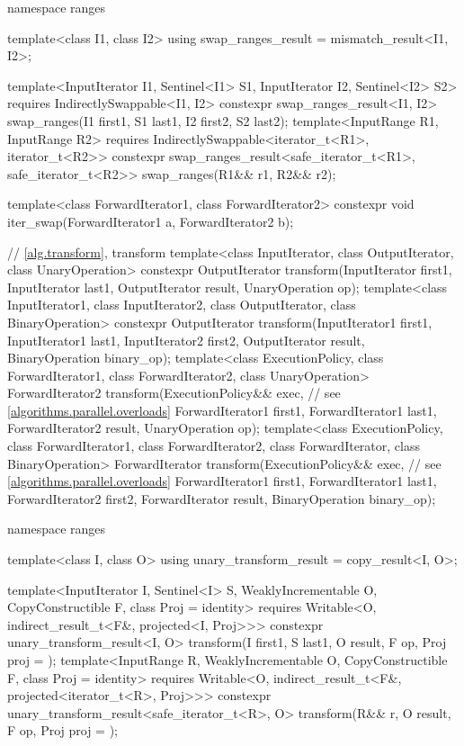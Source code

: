 \begin{codeblock}
{  namespace ranges {
    template<class I1, class I2>
    using swap_ranges_result = mismatch_result<I1, I2>;

    template<InputIterator I1, Sentinel<I1> S1, InputIterator I2, Sentinel<I2> S2>
      requires IndirectlySwappable<I1, I2>
      constexpr swap_ranges_result<I1, I2>
        swap_ranges(I1 first1, S1 last1, I2 first2, S2 last2);
    template<InputRange R1, InputRange R2>
      requires IndirectlySwappable<iterator_t<R1>, iterator_t<R2>>
      constexpr swap_ranges_result<safe_iterator_t<R1>, safe_iterator_t<R2>>
        swap_ranges(R1&& r1, R2&& r2);
  }

  template<class ForwardIterator1, class ForwardIterator2>
    constexpr void iter_swap(ForwardIterator1 a, ForwardIterator2 b);

  // \ref{alg.transform}, transform
  template<class InputIterator, class OutputIterator, class UnaryOperation>
    constexpr OutputIterator
      transform(InputIterator first1, InputIterator last1,
                OutputIterator result, UnaryOperation op);
  template<class InputIterator1, class InputIterator2, class OutputIterator,
           class BinaryOperation>
    constexpr OutputIterator
      transform(InputIterator1 first1, InputIterator1 last1,
                InputIterator2 first2, OutputIterator result,
                BinaryOperation binary_op);
  template<class ExecutionPolicy, class ForwardIterator1, class ForwardIterator2,
           class UnaryOperation>
    ForwardIterator2
      transform(ExecutionPolicy&& exec, // see \ref{algorithms.parallel.overloads}
                ForwardIterator1 first1, ForwardIterator1 last1,
                ForwardIterator2 result, UnaryOperation op);
  template<class ExecutionPolicy, class ForwardIterator1, class ForwardIterator2,
           class ForwardIterator, class BinaryOperation>
    ForwardIterator
      transform(ExecutionPolicy&& exec, // see \ref{algorithms.parallel.overloads}
                ForwardIterator1 first1, ForwardIterator1 last1,
                ForwardIterator2 first2, ForwardIterator result,
                BinaryOperation binary_op);

  namespace ranges {
    template<class I, class O>
    using unary_transform_result = copy_result<I, O>;

    template<InputIterator I, Sentinel<I> S, WeaklyIncrementable O,
        CopyConstructible F, class Proj = identity>
      requires Writable<O, indirect_result_t<F&, projected<I, Proj>>>
      constexpr unary_transform_result<I, O>
        transform(I first1, S last1, O result, F op, Proj proj = {});
    template<InputRange R, WeaklyIncrementable O, CopyConstructible F,
        class Proj = identity>
      requires Writable<O, indirect_result_t<F&, projected<iterator_t<R>, Proj>>>
      constexpr unary_transform_result<safe_iterator_t<R>, O>
        transform(R&& r, O result, F op, Proj proj = {});

}}
\end{codeblock}
